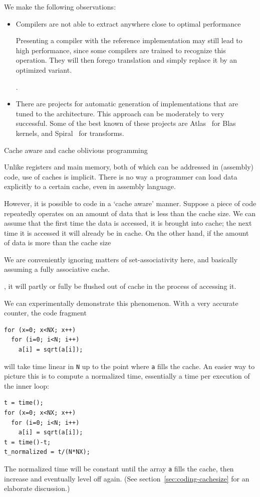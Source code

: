 We make the following observations:
\begin{itemize}
\item Compilers are not able to extract anywhere close
  to optimal performance
  \begin{footnoteenv}
    {Presenting a compiler with the
    reference implementation may still lead to high performance, since
    some compilers are trained to recognize this operation. They will
    then forego translation and simply replace it by an optimized
    variant.}
  \end{footnoteenv}
  .
\item There are  projects for automatic
  generation of implementations that are tuned to the
  architecture. This approach can be moderately to very
  successful. Some of the best known of these projects are
  Atlas~\cite{atlas-parcomp} for Blas kernels, and
  Spiral~\cite{spiral} for transforms.
\end{itemize}

 {Cache aware and cache oblivious programming}
\label{sec:cache-oblivious}

Unlike registers and main memory, both of
which can be addressed in (assembly) code, use of caches is
implicit. There is no way a programmer can load data explicitly to a
certain cache, even in assembly language. 

However, it is possible to code in a `cache aware' manner. Suppose a
piece of code repeatedly operates on an amount of data that is less
than the cache size. We can assume that the first time the data is
accessed, it is brought into cache; the next time it is accessed it
will already be in cache. On the other hand, if the amount of data is
more than the cache size
\begin{footnoteenv}
  {We are conveniently ignoring matters
  of set-associativity here, and basically assuming a fully
  associative cache.}
\end{footnoteenv}
, it will partly or fully be flushed out of cache
in the process of accessing it.

We can experimentally demonstrate this phenomenon. With a very
accurate counter, the code fragment
\begin{lstlisting}
for (x=0; x<NX; x++)
  for (i=0; i<N; i++)
    a[i] = sqrt(a[i]);
\end{lstlisting}
will take time linear in \texttt{N} up to the point where \texttt{a}
fills the cache. An easier way to picture this is to compute a
normalized time, essentially a time per execution of the inner loop:
\begin{lstlisting}
t = time();
for (x=0; x<NX; x++)
  for (i=0; i<N; i++)
    a[i] = sqrt(a[i]);
t = time()-t;
t_normalized = t/(N*NX);
\end{lstlisting}
The normalized time will be constant until the array \texttt{a} fills
the cache, then increase and eventually level off again. (See
section~\ref{sec:coding-cachesize} for an elaborate discussion.)

